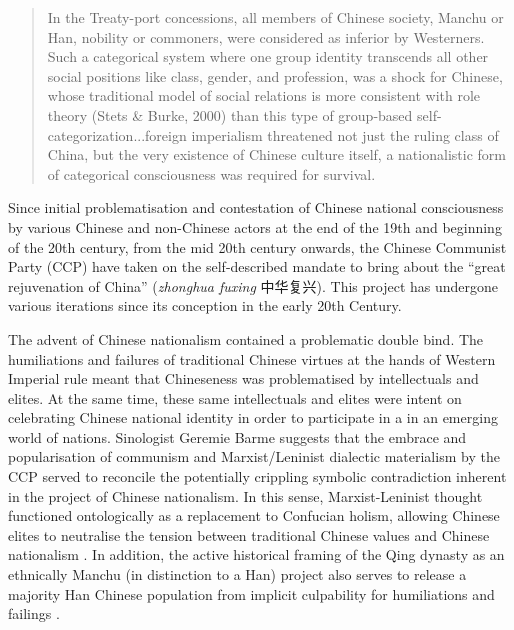 \begin{CJK}{UTF8}{gbsn}
\begin{quotation}
  In the Treaty-port concessions, all members of Chinese society, Manchu or Han, nobility or commoners, were considered as inferior by Westerners.  Such a categorical system where one group identity transcends all other social positions like class, gender, and profession, was a shock for Chinese, whose traditional model of social relations is more consistent with role theory (Stets & Burke, 2000) than this type of group-based self-categorization...foreign imperialism threatened not just the ruling class of China, but the very existence of Chinese culture itself, a nationalistic form of categorical consciousness was required for survival.  \citep[584-5]{Liu2009}
\end{quotation}

Since initial problematisation and contestation of Chinese national consciousness by various Chinese and non-Chinese actors at the end of the 19th and beginning of the 20th century, from the mid 20th century onwards, the Chinese Communist Party (CCP) have taken on the self-described mandate to bring about the ``great rejuvenation of China'' (\textit{zhonghua fuxing} 中华复兴).  This project has undergone various iterations since its conception in the early 20th Century.

The advent of Chinese nationalism contained a problematic double bind.
The humiliations and failures of traditional Chinese virtues at the hands of Western Imperial rule meant that Chineseness was problematised by intellectuals and elites.  At the same time, these same intellectuals and elites were intent on celebrating Chinese national identity in order to participate in a in an emerging world of nations.  Sinologist Geremie Barme suggests that the embrace and popularisation of communism and Marxist/Leninist dialectic materialism by the CCP served to reconcile the potentially crippling symbolic contradiction inherent in the project of Chinese nationalism. In this sense, Marxist-Leninist thought functioned ontologically as a replacement to Confucian holism, allowing Chinese elites to neutralise the tension between traditional Chinese values and Chinese nationalism \citep{Barme2009}.  In addition, the active historical framing of the Qing dynasty as an ethnically Manchu (in distinction to a Han) project also serves to release a majority Han Chinese population from implicit culpability for humiliations and failings \citep{Barme2015a}.


\end{CJK}
